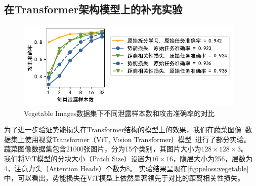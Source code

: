 \subsection{在Transformer架构模型上的补充实验}
\begin{figure}[h!]
    \centering
    \includegraphics[width=1\linewidth]{Z_Resources/peloss_vegetable-primary}
    \caption{Vegetable Images数据集下不同泄露样本数和攻击准确率的对比}
    \label{fig:peloss:vegetable}
\end{figure}
为了进一步验证势能损失在Transformer结构的模型上的效果，我们在蔬菜图像~\cite{vegetable_2021}数据集上使用视觉Transformer（ViT, Vision Transformer）模型~\cite{alexey_2021_vit}进行了部分实验。
%
蔬菜图像数据集包含21000张图片，分为15个类别，其图片大小为$128\times 128 \times 3$。
%
我们将ViT模型的分块大小（Patch Size）设置为$16\times 16$，隐层大小为256，层数为4，注意力头（Attention Heads）个数为8。
%
实验结果呈现在\autoref{fig:peloss:vegetable}中，可以看出，势能损失在ViT模型上依然显著领先于对比的距离相关性损失。